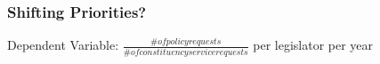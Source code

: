 \documentclass[xcolor=dvipsnames]{beamer}
\begin{document}
\begin{frame}
\frametitle{Shifting Priorities?}
Dependent Variable: $\frac{\# of policy requests}{\# of constituency service requests}$ per legislator per year

\end{frame}
\begin{frame}




\end{frame}



\end{document}
